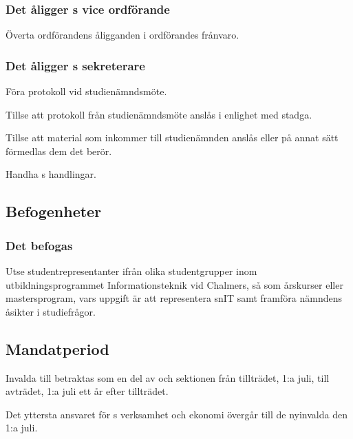 \subsubsection{Det åligger \SNIT{}s vice ordförande}
\begin{att}
	\item Överta ordförandens åligganden i ordförandes frånvaro.
\end{att}

\subsubsection{Det åligger \SNIT{}s sekreterare}
\begin{att}
	\item Föra protokoll vid studienämndsmöte.
	\item Tillse att protokoll från studienämndsmöte anslås i enlighet med stadga.
	\item Tillse att material som inkommer till studienämnden anslås eller på annat sätt förmedlas dem det berör.
	\item Handha \SNIT{}s handlingar.
\end{att}

\subsection{Befogenheter}

\subsubsection{Det befogas \SNIT}
\begin{att}
	\item Utse studentrepresentanter ifrån olika studentgrupper inom utbildningsprogrammet Informationsteknik vid Chalmers, så som årskurser eller mastersprogram, vars uppgift är att representera snIT samt framföra nämndens åsikter i studiefrågor.
\end{att}

\subsection{Mandatperiod}
Invalda till \SNIT{} betraktas som en del av \SNIT{} och sektionen från tillträdet, 1:a juli, till avträdet, 1:a juli ett år efter tillträdet.

Det yttersta ansvaret för \SNIT{}s verksamhet och ekonomi övergår till de nyinvalda den 1:a juli.
